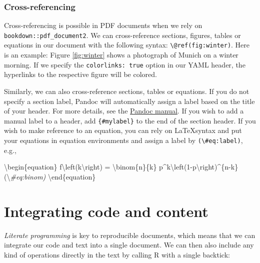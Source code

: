 \documentclass[
  11pt,
]{scrartcl}
\newenvironment{Shaded}{\begin{snugshade}}{\end{snugshade}}
\newcommand{\CommentTok}[1]{\textcolor[rgb]{0.56,0.35,0.01}{\textit{#1}}}
\newcommand{\DecValTok}[1]{\textcolor[rgb]{0.00,0.00,0.81}{#1}}
\newcommand{\FunctionTok}[1]{\textcolor[rgb]{0.00,0.00,0.00}{#1}}
\newcommand{\NormalTok}[1]{#1}
\newcommand{\OtherTok}[1]{\textcolor[rgb]{0.56,0.35,0.01}{#1}}
\newcommand{\SpecialCharTok}[1]{\textcolor[rgb]{0.00,0.00,0.00}{#1}}
\begin{document}
\hypertarget{cross-referencing}{%
\subsubsection{Cross-referencing}\label{cross-referencing}}

Cross-referencing is possible in PDF documents when we rely on \texttt{bookdown::pdf\_document2}. We can cross-reference sections, figures, tables or equations in our document with the following syntax: \texttt{\textbackslash{}@ref(fig:winter)}. Here is an example: Figure \ref{fig:winter} shows a photograph of Munich on a winter morning. If we specify the \texttt{colorlinks:\ true} option in our YAML header, the hyperlinks to the respective figure will be colored.

Similarly, we can also cross-reference sections, tables or equations. If you do not specify a section label, Pandoc will automatically assign a label based on the title of your header. For more details, see the \href{https://pandoc.org/MANUAL.html\#extension-auto_identifiers}{Pandoc manual}. If you wish to add a manual label to a header, add \texttt{\{\#mylabel\}} to the end of the section header. If you wish to make reference to an equation, you can rely on \LaTeX syntax and put your equations in equation environments and assign a label by \texttt{(\textbackslash{}\#eq:label)}, e.g.,

\begin{Shaded}
\begin{Highlighting}[]
\NormalTok{\textbackslash{}begin\{equation\} }
\NormalTok{  f\textbackslash{}}\FunctionTok{left}\NormalTok{(k\textbackslash{}right) }\OtherTok{=}\NormalTok{ \textbackslash{}binom\{n\}\{k\} p}\SpecialCharTok{\^{}}\NormalTok{k\textbackslash{}}\FunctionTok{left}\NormalTok{(}\DecValTok{1}\SpecialCharTok{{-}}\NormalTok{p\textbackslash{}right)}\SpecialCharTok{\^{}}\NormalTok{\{n}\SpecialCharTok{{-}}\NormalTok{k\}}
\NormalTok{  (\textbackslash{}}\CommentTok{\#eq:binom)}
\NormalTok{\textbackslash{}end\{equation\} }
\end{Highlighting}
\end{Shaded}

\hypertarget{integrating-code-and-content}{%
\section{Integrating code and content}\label{integrating-code-and-content}}

\emph{Literate programming} is key to reproducible documents, which means that we can integrate our code and text into a single document. We can then also include any kind of operations directly in the text by calling R with a single backtick:
\end{document}
